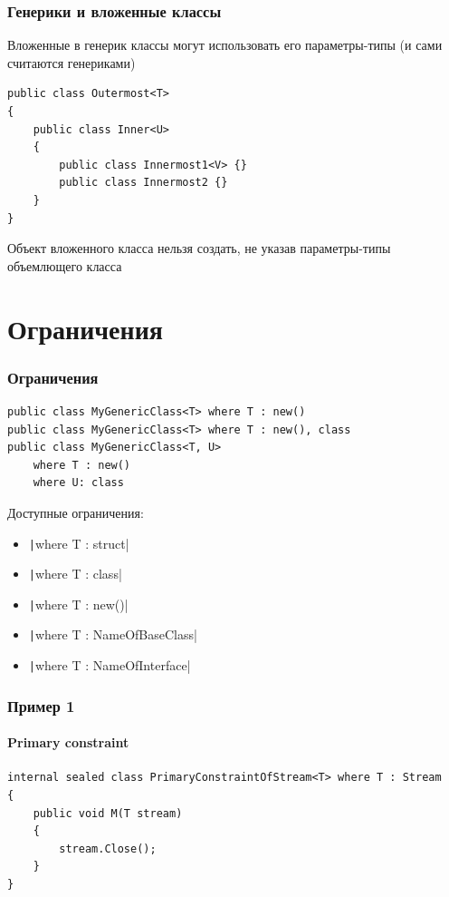 \documentclass[xetex,mathserif,serif]{beamer}
\begin{document}
	\begin{frame}[fragile]
		\frametitle{Генерики и вложенные классы}
		Вложенные в генерик классы могут использовать его параметры-типы (и сами считаются генериками)
		\vspace{5mm}
		\begin{footnotesize}
			\begin{verbatim}
public class Outermost<T>
{
    public class Inner<U>
    {
        public class Innermost1<V> {}
        public class Innermost2 {}
    }
}
			\end{verbatim}
		\end{footnotesize}
		\vspace{5mm}
		Объект вложенного класса нельзя создать, не указав параметры-типы объемлющего класса
	\end{frame}

	\section{Ограничения}
	
	\begin{frame}[fragile]
		\frametitle{Ограничения}
		\begin{verbatim}
public class MyGenericClass<T> where T : new()
public class MyGenericClass<T> where T : new(), class
public class MyGenericClass<T, U> 
    where T : new() 
    where U: class
		\end{verbatim}

		Доступные ограничения:
		\begin{itemize}
			\item \texttt|where T : struct|
			\item \texttt|where T : class|
			\item \texttt|where T : new()|
			\item \texttt|where T : NameOfBaseClass|
			\item \texttt|where T : NameOfInterface|
		\end{itemize}
	\end{frame}

	\begin{frame}[fragile]
		\frametitle{Пример 1}
		\framesubtitle{Primary constraint}
		\begin{footnotesize}
			\begin{verbatim}
internal sealed class PrimaryConstraintOfStream<T> where T : Stream 
{
    public void M(T stream) 
    {
        stream.Close();
    }
}
			\end{verbatim}
		\end{footnotesize}
	\end{frame}
\end{document}

